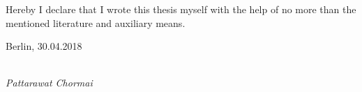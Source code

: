 \newpage

\thispagestyle{empty}

\begin{large}

\vspace*{6cm}

\noindent
Hereby I declare that I wrote this thesis myself with the help of no more than the mentioned literature and auxiliary means.
\vspace{2cm}

\noindent
Berlin, 30.04.2018

\vspace{3cm}

\hspace*{7cm}%
\dotfill\\
\hspace*{8.5cm}%
\textit{Pattarawat Chormai}

\end{large}
